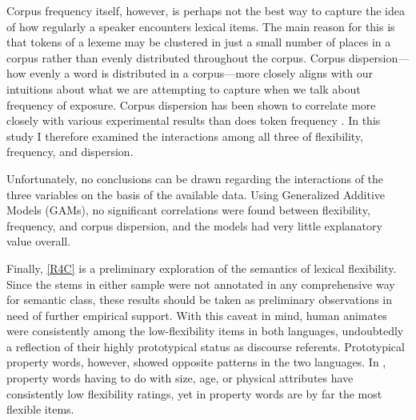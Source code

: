 Corpus frequency itself, however, is perhaps not the best way to capture the idea of how regularly a speaker encounters lexical items. The main reason for this is that tokens of a lexeme may be clustered in just a small number of places in a corpus rather than evenly distributed throughout the corpus. Corpus dispersion—how evenly a word is distributed in a corpus—more closely aligns with our intuitions about what we are attempting to capture when we talk about frequency of exposure. Corpus dispersion has been shown to correlate more closely with various experimental results than does token frequency \parencites{Gries2008}{Gries2010}{Griesfc}. In this study I therefore examined the interactions among all three of flexibility, frequency, and dispersion.

Unfortunately, no conclusions can be drawn regarding the interactions of the three variables on the basis of the available data. Using Generalized Additive Models (GAMs), no significant correlations were found between flexibility, frequency, and corpus dispersion, and the models had very little explanatory value overall.

Finally, \ref{R4C} is a preliminary exploration of the semantics of lexical flexibility. Since the stems in either sample were not annotated in any comprehensive way for semantic class, these results should be taken as preliminary observations in need of further empirical support. With this caveat in mind, human animates were consistently among the low-flexibility items in both languages, undoubtedly a reflection of their highly prototypical status as discourse referents. Prototypical property words, however, showed opposite patterns in the two languages. In , property words having to do with size, age, or physical attributes have consistently low flexibility ratings, yet in  property words are by far the most flexible items.

